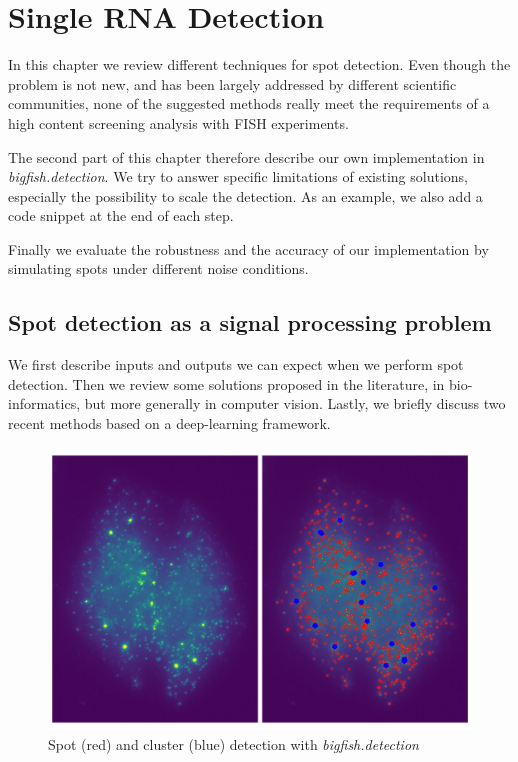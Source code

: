 
\graphicspath{{./figures/chapter2/}}


\chapter{Single RNA Detection} \label{ch:chapter2}
\minitoc
\newpage

In this chapter we review different techniques for spot detection.
Even though the problem is not new, and has been largely addressed by different scientific communities, none of the suggested methods really meet the requirements of a high content screening analysis with \ac{FISH} experiments.

The second part of this chapter therefore describe our own implementation in \mbox{\emph{bigfish.detection}}.
We try to answer specific limitations of existing solutions, especially the possibility to scale the detection.
As an example, we also add a code snippet at the end of each step.

Finally we evaluate the robustness and the accuracy of our implementation by simulating spots under different noise conditions.

\section{Spot detection as a signal processing problem} \label{sec:detection_introduction}

We first describe inputs and outputs we can expect when we perform spot detection.
Then we review some solutions proposed in the literature, in bio-informatics, but more generally in computer vision.
Lastly, we briefly discuss two recent methods based on a deep-learning framework.

\begin{figure}[h]
    \centering
    \includegraphics[width=1\textwidth]{figures/chapter2/cluster_detection_results}
    \caption{Spot (red) and cluster (blue) detection with \emph{bigfish.detection}}
    \label{fig:detection_results}
\end{figure}

